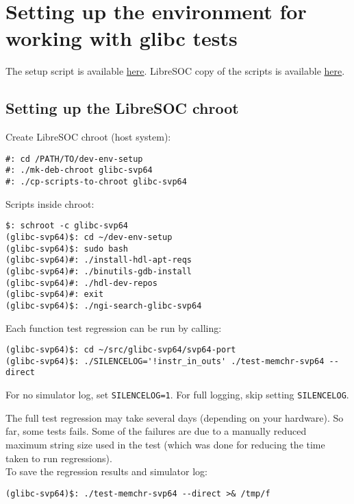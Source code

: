 \section{Setting up the environment for working with glibc tests}

The setup script is available
\href{https://git.vantosh.com/ngisearch/documentation/src/branch/master/shell-scripts}{here}.
LibreSOC copy of the scripts is available
\href{https://git.libre-soc.org/?p=dev-env-setup.git;a=tree}{here}.

\subsection{Setting up the LibreSOC chroot}

Create LibreSOC chroot (host system):

\begin{verbatim}
#: cd /PATH/TO/dev-env-setup
#: ./mk-deb-chroot glibc-svp64
#: ./cp-scripts-to-chroot glibc-svp64
\end{verbatim}

Scripts inside chroot:

\begin{verbatim}
$: schroot -c glibc-svp64
(glibc-svp64)$: cd ~/dev-env-setup
(glibc-svp64)$: sudo bash
(glibc-svp64)#: ./install-hdl-apt-reqs
(glibc-svp64)#: ./binutils-gdb-install
(glibc-svp64)#: ./hdl-dev-repos
(glibc-svp64)#: exit
(glibc-svp64)$: ./ngi-search-glibc-svp64
\end{verbatim}

Each function test regression can be run by calling:

\begin{verbatim}
(glibc-svp64)$: cd ~/src/glibc-svp64/svp64-port
(glibc-svp64)$: ./SILENCELOG='!instr_in_outs' ./test-memchr-svp64 --direct
\end{verbatim}

For no simulator log, set \texttt{SILENCELOG=1}.
For full logging, skip setting \texttt{SILENCELOG}.

The full test regression may take several days (depending on your hardware).
So far, some tests fails. Some of the failures are due to a manually reduced
maximum string size used in the test (which was done for reducing the time
taken to run regressions).\\

To save the regression results and simulator log:

\begin{verbatim}
(glibc-svp64)$: ./test-memchr-svp64 --direct >& /tmp/f
\end{verbatim}


